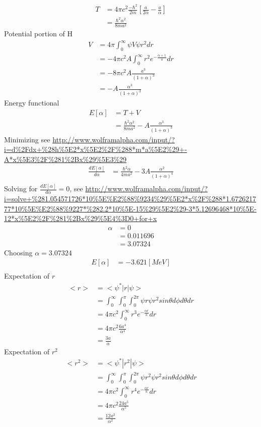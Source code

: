 \documentclass{article}
\begin{document}
\begin{align*}
T&=4\pi c^2 \frac{-\hbar^2}{2m}[\frac{a}{2 \alpha} -\frac{a}{\alpha}]\\
 &=\frac{\hbar^2 \alpha^2} {8 m a^2} 
\end{align*}
Potential portion of H
\begin{align*}
V&=4 \pi\int_0^{\infty}\psi V \psi r^2 dr\\
 &=-4 \pi c^2 A \int_0^{\infty}r^2 e^{-\frac{\alpha+1}{a}}dr\\
 &=-8 \pi c^2 A \frac{a^3}{(1+\alpha)^3}\\
 &=-A\frac{\alpha^3}{(1+\alpha)^3}
\end{align*}
Energy functional
\begin{align*}
E[\alpha]&=T+V\\
 &=\frac{\hbar^2 \alpha^2} {8 m a^2} -A\frac{\alpha^3}{(1+\alpha)^3}
\end{align*}
Minimizing see \url{http://www.wolframalpha.com/input/?i=d%2Fdx+%28h%5E2*x%5E2%2F%288*m*a%5E2%29+-A*x%5E3%2F%281%2Bx%29%5E3%29}
\begin{align*}
\frac{d E[\alpha]}{d \alpha}&=\frac{\hbar^2 \alpha} {4 m a^2} -3A\frac{\alpha^2}{(1+\alpha)^4}\\
\end{align*}
Solving for $\frac{d E[\alpha]}{d \alpha}=0$, see \url{http://www.wolframalpha.com/input/?i=solve+%281.054571726*10%5E%E2%88%9234%29%5E2*x%2F%288*1.672621777*10%5E%E2%88%9227*%282.2*10%5E-15%29%5E2%29-3*5.12696468*10%5E-12*x%5E2%2F%281%2Bx%29%5E4%3D0+for+x}
\begin{align*}
\alpha&=0\\
&=0.011696\\
&=3.07324
\end{align*}
Choosing $\alpha=3.07324$
\begin{align*}
E[\alpha]&=-3.621 [MeV]\\
\end{align*}
Expectation of $r$
\begin{align*}
<r>&=<\psi^*|r|\psi>\\
&=\int_0^{\infty}\int_0^{\pi}\int_0^{2\pi}\psi r \psi r^2 sin\theta d\phi d\theta dr\\
&=4\pi c^2 \int_0^{\infty}r^3e^{-\frac{\alpha r}{a}}dr\\
&=4\pi c^2 \frac{6a^4}{\alpha^4}\\
&=\frac{3a}{\alpha}
\end{align*}
Expectation of $r^2$
\begin{align*}
<r^2>&=<\psi^*|r^2|\psi>\\
&=\int_0^{\infty}\int_0^{\pi}\int_0^{2\pi}\psi r^2 \psi r^2 sin\theta d\phi d\theta dr\\
&=4\pi c^2 \int_0^{\infty}r^4e^{-\frac{\alpha r}{a}}dr\\
&=4\pi c^2 \frac{24a^5}{\alpha^5}\\
&=\frac{12a^2}{\alpha^2}
\end{align*}
\end{document}
